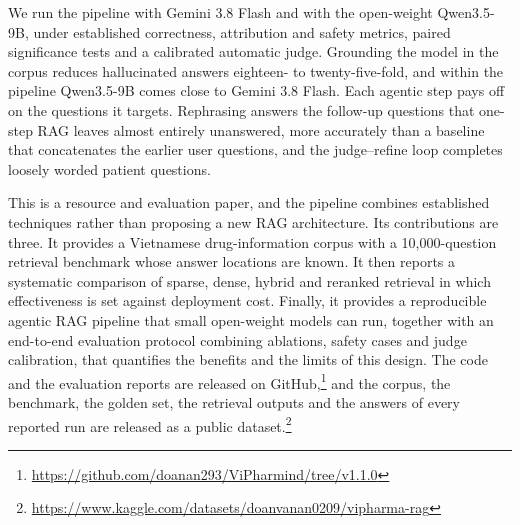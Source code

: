 We run the pipeline with Gemini 3.8 Flash and with the open-weight Qwen3.5-9B, under established correctness, attribution and safety metrics, paired significance tests and a calibrated automatic judge. Grounding the model in the corpus reduces hallucinated answers eighteen- to twenty-five-fold, and within the pipeline Qwen3.5-9B comes close to Gemini 3.8 Flash. Each agentic step pays off on the questions it targets. Rephrasing answers the follow-up questions that one-step RAG leaves almost entirely unanswered, more accurately than a baseline that concatenates the earlier user questions, and the judge--refine loop completes loosely worded patient questions.

This is a resource and evaluation paper, and the pipeline combines established techniques rather than proposing a new RAG architecture. Its contributions are three. It provides a Vietnamese drug-information corpus with a 10{,}000-question retrieval benchmark whose answer locations are known. It then reports a systematic comparison of sparse, dense, hybrid and reranked retrieval in which effectiveness is set against deployment cost. Finally, it provides a reproducible agentic RAG pipeline that small open-weight models can run, together with an end-to-end evaluation protocol combining ablations, safety cases and judge calibration, that quantifies the benefits and the limits of this design. The code and the evaluation reports are released on GitHub,\footnote{\url{https://github.com/doanan293/ViPharmind/tree/v1.1.0}} and the corpus, the benchmark, the golden set, the retrieval outputs and the answers of every reported run are released as a public dataset.\footnote{\url{https://www.kaggle.com/datasets/doanvanan0209/vipharma-rag}}
